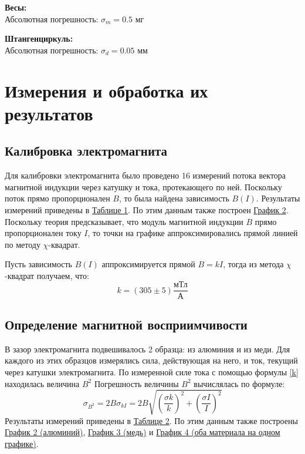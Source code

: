 \documentclass[15pt,a5paper,reqno]{article}
\begin{document}
    \noindent\textbf{Весы:}\\
        Абсолютная погрешность: $\sigma_{m} = 0.5\text{ мг}$

    \noindent\textbf{Штангенциркуль:}\\
        Абсолютная погрешность: $\sigma_{d} = 0.05\text{ мм}$

\section{Измерения и обработка их результатов}

    \subsection{Калибровка электромагнита}

        Для калибровки электромагнита было проведено 16 измерений потока вектора магнитной индукции через катушку и тока, протекающего по ней. Поскольку поток прямо пропорционален $B$, то была найдена зависимость $B(I)$. Результаты измерений приведены в \hyperlink{table_1}{Таблице 1}. По этим данным также построен \hyperlink{graph_1}{График 2}. Поскольку теория предсказывает, что модуль магнитной индукции $B$ прямо пропорционален току $I$, то точки на графике аппроксимировались прямой линией по методу $\chi$-квадрат.

        Пусть зависимость $B(I)$ аппроксимируется прямой $B = kI$, тогда из метода $\chi$-квадрат получаем, что:
        \begin{equation}\label{k}
            k = (305 \pm 5)\frac{\text{мТл}}{\text{А}}
        \end{equation}

    \subsection{Определение магнитной восприимчивости}

        В зазор электромагнита подвешивалось 2 образца: из алюминия и из меди. Для каждого из этих образцов измерялись сила, действующая на него, и ток, текущий через катушки электромагнита. По измеренной силе тока с помощью формулы \eqref{k} находилась величина $B^2$ Погрешность величины $B^2$ вычислялась по формуле:
        \begin{equation*}
            \sigma_{B^2} = 2B\sigma_{kI} = 2B\sqrt{\left(\frac{\sigma{k}}{k}\right)^2 + \left(\frac{\sigma{I}}{I}\right)^2}
        \end{equation*}
        Результаты измерений приведены в \hyperlink{table_2}{Таблице 2}. По этим данным также построены \hyperlink{graph_al}{График 2 (алюминий)}, \hyperlink{graph_cu}{График 3 (медь)} и \hyperlink{graph_mix}{График 4 (оба материала на одном графике)}.
\end{document}
